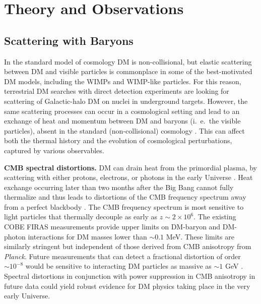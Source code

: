 \documentclass[12pt]{article}
\begin{document}
\section{Theory and Observations}
\label{sec:thobs}
\vspace{-0.2cm}
\subsection{Scattering with Baryons}

In the standard model of cosmology DM is non-collisional, but elastic scattering between DM and visible particles is commonplace in some of the best-motivated DM models, including the WIMPs and WIMP-like particles.
For this reason, terrestrial DM searches with direct detection experiments are looking for scattering of Galactic-halo DM on nuclei in underground targets.
However, the same scattering processes can occur in a cosmological setting and lead to an exchange of heat and momentum between DM and baryons (i.~e.~the visible particles), absent in the standard (non-collisional) cosmology \cite{Boddy:2018kfv,Gluscevic:2017ywp,Boddy:2018wzy,Xu:2018efh,Slatyer:2018aqg,Dvorkin:2013cea,2001PhLB..518....8B,2005A&A...438..419B,2004NuPhB.683..219B,Sigurdson:2004zp}. 
This can affect both the thermal history and the evolution of cosmological perturbations, captured by various observables.

\textbf{CMB spectral distortions.} 
DM can drain heat from the primordial plasma, by scattering with either protons, electrons, or photons in the early Universe \cite{AliHaimoud_15}.
Heat exchange occurring later than two months after the Big Bang cannot fully thermalize and thus leads to distortions of the CMB frequency spectrum away from a perfect blackbody \cite{Hu_96,2012MNRAS.419.1294C}.  
The CMB frequency spectrum is most sensitive to light particles that thermally decouple as early as $z \sim 2 \times 10^6$.
The existing COBE FIRAS measurements provide upper limits on DM-baryon and DM-photon interactions for DM masses lower than $\sim 0.1$ MeV. 
These limits are similarly stringent but independent of those derived from CMB anisotropy from \textit{Planck}.
Future measurements that can detect a fractional distortion of order $\sim 10^{-8}$ would be sensitive to interacting DM particles as massive as $\sim 1$ GeV \cite{AliHaimoud_15}. 
Spectral distortions in conjunction with power suppression in CMB anisotropy in future data could yield robust evidence for DM physics taking place in the very early Universe.
\end{document}
